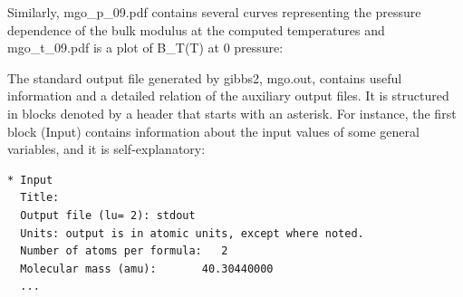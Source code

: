 \documentclass[a4paper]{article}
\begin{document}
Similarly, mgo\_p\_09.pdf contains several curves representing the
pressure dependence of the bulk modulus at the computed temperatures
and mgo\_t\_09.pdf is a plot of B\_T(T) at 0 pressure:

\noindent{}

\noindent{}

The standard output file generated by gibbs2, mgo.out, contains useful
information and a detailed relation of the auxiliary output files. It
is structured in blocks denoted by a header that starts with an
asterisk. For instance, the first block (Input) contains information
about the input values of some general variables, and it is
self-explanatory:
%
\asciilist
\begin{lstlisting}
* Input
  Title:
  Output file (lu= 2): stdout
  Units: output is in atomic units, except where noted.
  Number of atoms per formula:   2
  Molecular mass (amu):       40.30440000
  ...
\end{lstlisting}
\end{document}
